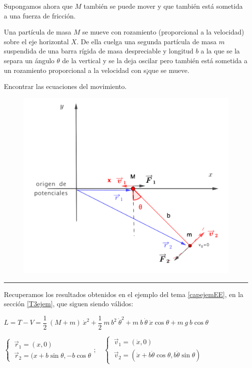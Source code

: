 Supongamos ahora que $M$ también se puede mover y que también está sometida a una fuerza de fricción.

\vspace{0.5cm}
\begin{example}

\begin{multicols}{2}

	Una partícula de masa $M$ se mueve con rozamiento (proporcional a la velocidad) sobre el eje horizontal $X$. De ella cuelga una segunda partícula de masa $m$ suspendida de una barra rígida de masa despreciable y longitud $b$ a la que se la separa un ángulo $\theta$ de la vertical y se la deja oscilar pero también está sometida a un rozamiento proporcional a la velocidad con s¡que se mueve. 	
	
	\vspace{2mm} Encontrar las ecuaciones del movimiento.

	\begin{figure}[H]
		\centering
		\includegraphics[width=.5\textwidth]{imagenes/img04-03.png}
		\end{figure}
\end{multicols}	
\end{example}

\vspace{0.5 cm}
\rule{200pt}{0.1pt}

Recuperamos los resultados obtenidos en el ejemplo del tema \ref{capejemEE}, en la sección \ref{T3ejem}, que siguen siendo válidos:

$ 
 L=T-V=  
 \dfrac 1 2 \ (M+m)\ \dot x^2  + 
 \dfrac 1 2 \ m \ b^2 \ \dot \theta^2 +
 m \ b \ \dot \theta \ \dot x \cos \theta +
 m\ g \ b \cos \theta 
$

$\begin{cases}
\ \overrightarrow r_1= (x,0) \\
\ \overrightarrow r_2=(x+b\sin \theta, -b\cos \theta	
\end{cases};
\quad
\begin{cases}
\ \overrightarrow v_1=(\dot x, 0) \\
\ \overrightarrow v_2=(\dot x + b \dot \theta \cos \theta, b \dot \theta \sin \theta)	
\end{cases}$

